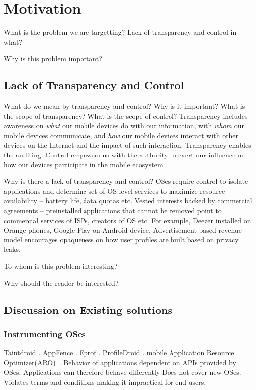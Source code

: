 \section{Motivation}

What is the problem we are targetting?
Lack of transparency and control in what?

Why is this problem important? 

\subsection{Lack of Transparency and Control} 

What do we mean by transparency and control? 
Why is it important?
What is the scope of transparency? 
What is the scope of control?
Transparency includes awareness on \emph{what} our mobile devices do with our information, with \emph{whom} our mobile devices communicate, and \emph{how} our mobile devices interact with other devices on the Internet and the impact of such interaction.
Transparency enables the auditing.
Control empowers us with the authority to exert our influence on how our devices participate in the mobile ecosystem

Why is there a lack of transparency and control?
OSes require control to isolate applications and determine set of OS level services to maximize resource availability -- battery life, data quotas etc. 
Vested interests backed by commercial agreements -- preinstalled applications that cannot be removed point to commercial services of ISPs, creators of OS etc. For example, Deezer installed on Orange phones, Google Play on Android device. 
Advertisement based revenue model encourages opaqueness on how user profiles are built based on privacy leaks. 

To whom is this problem interesting?

Why should the reader be interested?


\subsection{Discussion on Existing solutions}

\subsubsection{Instrumenting OSes}

Taintdroid \cite{enck:taintdroid}.
AppFence \cite{hornyack:appfence}.
Eprof \cite{pathak:eprof}.
ProfileDroid \cite{wei:profiledroid}.
mobile Application Resource Optimizer(ARO)~\cite{qian:mobilearo}.
Behavior of applications dependent on APIs provided by OSes. 
Applications can therefore behave differently 
Does not cover new OSes.
Violates terms and conditions making it impractical for end-users. 

